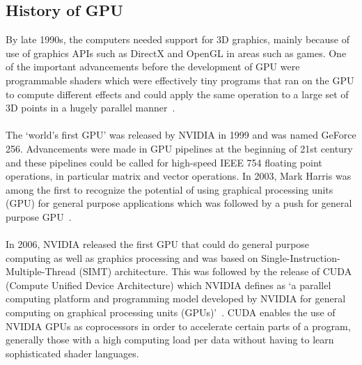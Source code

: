 \documentclass[thesis.tex]{subfiles}
\begin{document}
\subsection{History of GPU}
By late 1990s, the computers needed support for 3D graphics, mainly because of use of graphics APIs such as DirectX and OpenGL in areas such as games. One of the important advancements before the development of GPU were programmable shaders which were effectively tiny programs that ran on the GPU to compute different effects and could apply the same operation to a large set of 3D points in a hugely parallel manner~\cite{ElsevierCUDA}. \\\\
The ‘world’s first GPU’ was released by NVIDIA in 1999 and was named GeForce 256. Advancements were made in GPU pipelines at the beginning of 21st century and these pipelines could be called for high-speed IEEE 754 floating point operations, in particular matrix and vector operations. In 2003, Mark Harris was among the first to recognize the potential of using graphical processing units (GPU) for general purpose applications which was followed by a push for general purpose GPU~\cite{Harris}.\\\\
In 2006, NVIDIA released the first GPU that could do general purpose computing as well as graphics processing and was based on Single-Instruction-Multiple-Thread (SIMT) architecture. This was followed by the release of CUDA (Compute Unified Device Architecture) which NVIDIA defines as ‘a parallel computing platform and programming model developed by NVIDIA for general computing on graphical processing units (GPUs)’~\cite{cuda}. CUDA enables the use of NVIDIA GPUs as coprocessors in order to accelerate certain parts of a program, generally those with a high computing load per data without having to learn sophisticated shader languages.
\end{document}
